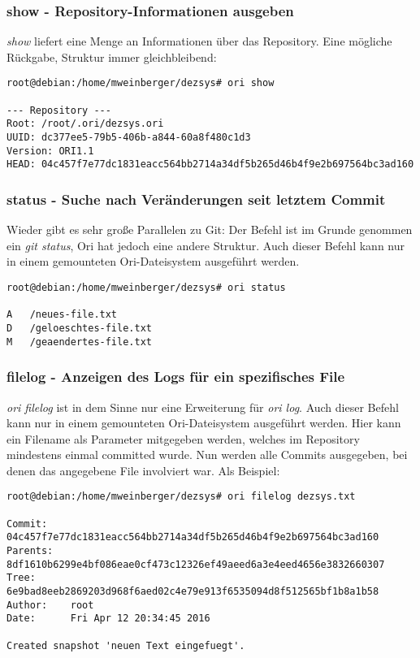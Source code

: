 \subsubsection{show - Repository-Informationen ausgeben}
\label{subsubsec:show - Repository-Informationen ausgeben}
\textit{show} liefert eine Menge an Informationen über das Repository. Eine mögliche Rückgabe, Struktur immer gleichbleibend:
\begin{lstlisting}[frame=single, caption=show]
root@debian:/home/mweinberger/dezsys# ori show

--- Repository ---
Root: /root/.ori/dezsys.ori
UUID: dc377ee5-79b5-406b-a844-60a8f480c1d3
Version: ORI1.1
HEAD: 04c457f7e77dc1831eacc564bb2714a34df5b265d46b4f9e2b697564bc3ad160
\end{lstlisting}

\subsubsection{status - Suche nach Veränderungen seit letztem Commit}
\label{subsubsec:status - Suche nach Veränderungen seit letztem Commit}
Wieder gibt es sehr große Parallelen zu Git: Der Befehl ist im Grunde genommen ein \textit{git status}, Ori hat jedoch eine andere Struktur. Auch dieser Befehl kann nur in einem gemounteten Ori-Dateisystem ausgeführt werden.
\begin{lstlisting}[frame=single, caption=status]
root@debian:/home/mweinberger/dezsys# ori status

A	/neues-file.txt
D	/geloeschtes-file.txt
M	/geaendertes-file.txt
\end{lstlisting}

\subsubsection{filelog - Anzeigen des Logs für ein spezifisches File}
\label{subsubsec:filelog - Anzeigen des Logs für ein spezifisches File}
\textit{ori filelog} ist in dem Sinne nur eine Erweiterung für \textit{ori log}. Auch dieser Befehl kann nur in einem gemounteten Ori-Dateisystem ausgeführt werden. Hier kann ein Filename als Parameter mitgegeben werden, welches im Repository mindestens einmal committed wurde. Nun werden alle Commits ausgegeben, bei denen das angegebene File involviert war. Als Beispiel:
\begin{lstlisting}[frame=single, caption=filelog]
root@debian:/home/mweinberger/dezsys# ori filelog dezsys.txt

Commit:    04c457f7e77dc1831eacc564bb2714a34df5b265d46b4f9e2b697564bc3ad160
Parents:   8df1610b6299e4bf086eae0cf473c12326ef49aeed6a3e4eed4656e3832660307
Tree:      6e9bad8eeb2869203d968f6aed02c4e79e913f6535094d8f512565bf1b8a1b58
Author:    root
Date:      Fri Apr 12 20:34:45 2016

Created snapshot 'neuen Text eingefuegt'.
\end{lstlisting}

